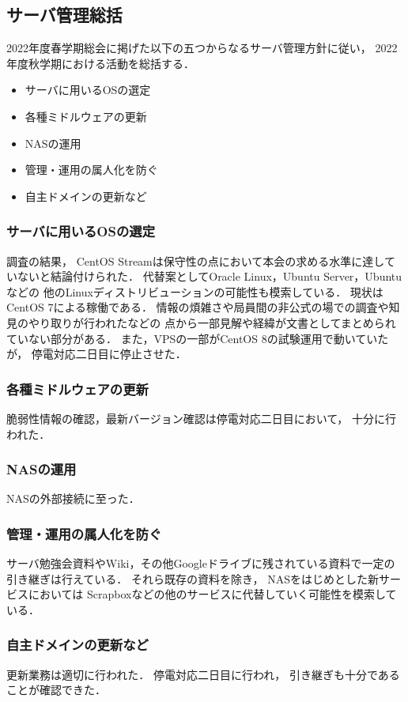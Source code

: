 \subsection*{サーバ管理総括}


2022年度春学期総会に掲げた以下の五つからなるサーバ管理方針に従い，
2022年度秋学期における活動を総括する．
\begin{itemize}
    \item サーバに用いるOSの選定
    \item 各種ミドルウェアの更新
    \item NASの運用
    \item 管理・運用の属人化を防ぐ
    \item 自主ドメインの更新など
\end{itemize}

\subsubsection*{サーバに用いるOSの選定}
調査の結果，
CentOS Streamは保守性の点において本会の求める水準に達していないと結論付けられた．
代替案としてOracle Linux，Ubuntu Server，Ubuntuなどの
他のLinuxディストリビューションの可能性も模索している．
現状はCentOS 7による稼働である．
情報の煩雑さや局員間の非公式の場での調査や知見のやり取りが行われたなどの
点から一部見解や経緯が文書としてまとめられていない部分がある．
また，VPSの一部がCentOS 8の試験運用で動いていたが，
停電対応二日目に停止させた．

\subsubsection*{各種ミドルウェアの更新}
脆弱性情報の確認，最新バージョン確認は停電対応二日目において，
十分に行われた．

\subsubsection*{NASの運用}
NASの外部接続に至った．

\subsubsection*{管理・運用の属人化を防ぐ}
サーバ勉強会資料やWiki，その他Googleドライブに残されている資料で一定の引き継ぎは行えている．
それら既存の資料を除き，
NASをはじめとした新サービスにおいては
Scrapboxなどの他のサービスに代替していく可能性を模索している．

\subsubsection*{自主ドメインの更新など}
更新業務は適切に行われた．
停電対応二日目に行われ，
引き継ぎも十分であることが確認できた．
